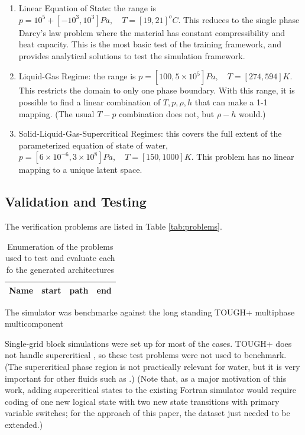 \documentclass[]{article}
\begin{document}
\begin{enumerate}
\def\labelenumi{\arabic{enumi}.}
\item Linear Equation of State: the range is $ p = 10^5+[-10^3, 10^3]
  Pa,\quad T = [ 19, 21 ] ^o C$. This reduces to the single phase
  Darcy's law problem where the material has constant compressibility
  and heat capacity. This is the most basic test of the training
  framework, and provides analytical solutions to test the simulation
  framework.
\item Liquid-Gas Regime: the range is  $ p = [100,5\times 10^5] Pa,
  \quad T = [274,594] K$. This restricts the domain to only one phase
  boundary. With this range, it is possible to find a linear
  combination of $T,p,\rho,h$ that can make a 1-1 mapping. (The usual
  $T-p$ combination does not, but $\rho-h$ would.)
\item Solid-Liquid-Gas-Supercritical Regimes: this covers the full
  extent of the parameterized equation of state of water,
    $ p = [6\times 10^{-6},3\times 10^8]Pa, \quad T = [150,1000] K
    $. This problem has no linear mapping to a unique latent space.
\end{enumerate}

\hypertarget{header-n3418}{%
\subsection{Validation and Testing}\label{header-n3418}}

The verification problems are listed in Table \ref{tab:problems}.
\begin{table}
  \caption{\label{tag:problems}Enumeration of the problems used to test and evaluate each fo the generated architectures}
\begin{tabular}{l|c|c|c}
  Name & start & path & end\\
\hline
\end{tabular}
\end{table}
The simulator was benchmarke against the long standing TOUGH+ multiphase
multicomponent

Single-grid block simulations were set up for most of the cases. TOUGH+
does not handle supercritical , so these test problems were not
used to benchmark. (The supercritical phase region is not practically
relevant for water, but it is very important for other fluids such as
.) (Note that, as a major motivation of this work, adding
supercritical states to the existing Fortran simulator would require
coding of one new logical state with two new state transitions with
primary variable switches; for the approach of this paper, the dataset
just needed to be extended.)
\end{document}
